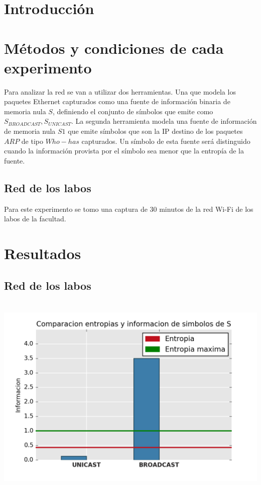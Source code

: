 \documentclass[a4paper, 10pt, twoside]{article}
\begin{document}
\tableofcontents

\newpage


\section{Introducción}

\section{Métodos y condiciones de cada experimento}
Para analizar la red se van a utilizar dos herramientas. Una que modela los paquetes Ethernet capturados como una fuente de información binaria de memoria nula $S$, definiendo el conjunto de símbolos que emite como ${S_{BROADCAST}, S_{UNICAST}}$. La segunda herramienta modela una fuente de información de memoria nula $S1$ que emite símbolos que son la IP destino de los paquetes $ARP$ de tipo $Who-has$ capturados. Un símbolo de esta fuente será distinguido cuando la información provista por el símbolo sea menor que la entropía de la fuente.

\subsection{Red de los labos}
Para este experimento se tomo una captura de 30 minutos de la red Wi-Fi de los labos de la facultad.

\section{Resultados}

\subsection{Red de los labos}

\includegraphics[height=10cm]{grafico1-red-labos.png} 
\end{document}
